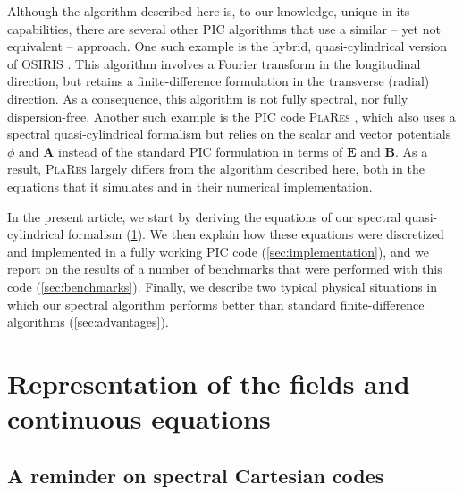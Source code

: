 \documentclass[1p,times,authoryear]{elsarticle}
\renewcommand{\vec}[1]{\boldsymbol{#1}}
\begin{document}
Although the algorithm described here is, to our knowledge, unique in
its capabilities, there are several other PIC algorithms that use 
a similar -- yet not equivalent -- approach. One such example is the
hybrid, quasi-cylindrical version of \textsc{OSIRIS} \citep{Yuarxiv2015}. This algorithm
involves a Fourier transform in the longitudinal direction, but
retains a finite-difference formulation in the transverse (radial)
direction. As a consequence, this algorithm is not fully spectral, nor
fully dispersion-free. Another such example is the PIC code \textsc{PlaRes} 
\citep{AndriyashJCP2015}, which also uses a spectral quasi-cylindrical
formalism but relies on the scalar and vector potentials
$\phi$ and $\vec{A}$ instead of the standard PIC formulation in terms
of $\vec{E}$ and $\vec{B}$. As a result, \textsc{PlaRes} largely differs from the
algorithm described here, both in the equations that it simulates and
in their numerical implementation.

In the present article, we start by deriving the equations of our
spectral quasi-cylindrical formalism (\cref{sec:theory}). We then explain
how these equations were discretized and implemented in a fully
working PIC code (\cref{sec:implementation}), and we report on the
results of a number of benchmarks that were performed with this code 
(\cref{sec:benchmarks}). Finally, we describe two typical physical situations in
which our spectral algorithm performs better than standard 
finite-difference algorithms (\cref{sec:advantages}).

\section{Representation of the fields and continuous equations}
\label{sec:theory}

\subsection{A reminder on spectral Cartesian codes}
\end{document}
